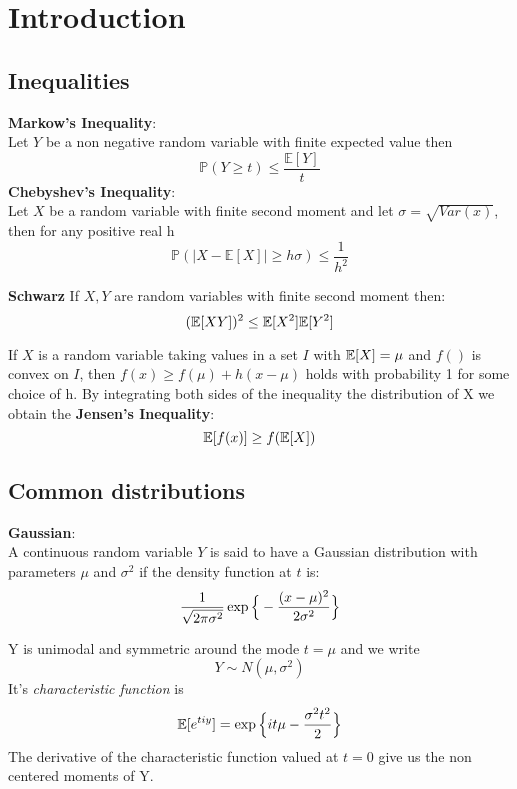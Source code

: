 \chapter{Introduction}
\label{cha:intro}
\vspace{15pt}




\section{Inequalities}
\label{sec:inequalities}
\vspace{10pt}
\textbf{Markow's Inequality}:\\
Let $Y$ be a non negative random variable with finite expected value then
$$ \mathbb{P}(Y \geq t)\leq \frac{\mathbb{E}[Y]}{t}$$
\textbf{Chebyshev's Inequality}:\\
Let $X$ be a random variable with finite second moment and let $\sigma=\sqrt{Var(x)}$, then for any positive real h
\begin{equation}\label{eq:Chebyshev}
	\mathbb{P}(|X-\mathbb{E}[X]|\geq h\sigma)\leq \frac{1}{h^2}
\end{equation}
\begin{teo}\textbf{Schwarz}
If $X,Y$ are random variables with finite second moment then:
$$ ( \mathbb{E} [XY])^2 \leq \mathbb{E} [X^2] \mathbb{E} [Y^2]$$
\end{teo}

If $X$ is a random variable taking values in a set $I$ with $\mathbb{E} [X]=\mu$  and $f()$ is convex on $I$, then $f(x)\geq f(\mu) + h(x-\mu)$ holds with probability 1 for some choice of h.
By integrating both sides of the inequality \wrt the distribution of X we obtain the \textbf{Jensen's Inequality}:
$$\mathbb{E} [f(x)]\geq f(\mathbb{E} [X]) $$

\section{Common distributions}
\label{sec:dist}
\textbf{Gaussian}:\\
A continuous random variable $Y$ is said to have a Gaussian distribution with parameters $\mu$ and $\sigma ^ 2$ if the density function at $t$ is:
$$\frac{1}{\sqrt{2\pi \sigma ^2}} \exp \Big\{ - \frac{(x-\mu)^2}{2 \sigma^2} \Big\}$$


Y is unimodal and symmetric around the mode $t=\mu$ and we write
$$Y \sim  N(\mu , \sigma ^2)$$
It's \textit{characteristic function} is
$$\mathbb{E} [e^{ tiy }]=\exp \Big\{ it \mu -\frac{\sigma ^2 t ^2}{2} \Big\}$$
The derivative of  the characteristic function valued at $t=0$ give us the non centered moments of Y.\\

